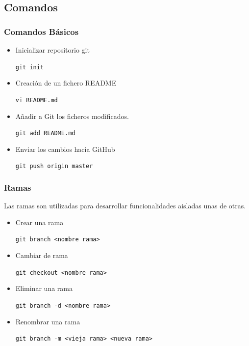 \documentclass{beamer}
\begin{document}
\subsection{Comandos}
	\begin{frame}
		\frametitle{Comandos Básicos}
		\begin{itemize}
			\item Inicializar repositorio git
			\begin{center}
				 {\tt \scriptsize git init}\\
			\end{center}
			\item Creación de un fichero README 
			\begin{center}
				 {\tt \scriptsize vi README.md}\\
			\end{center}
			\item Añadir a Git los ficheros modificados.
			\begin{center}
				 {\tt \scriptsize git add README.md}\\	 
			\end{center}
			\item Enviar los cambios hacia GitHub
			\begin{center}
				 {\tt \scriptsize git push origin master}\\	 
			\end{center}
		\end{itemize}
	\end{frame}
	\begin{frame}
		\frametitle{Ramas}
		Las ramas son utilizadas para desarrollar funcionalidades aisladas unas de otras.
		\begin{itemize}
			\item Crear una rama
			\begin{center}
				 {\tt \scriptsize git branch <nombre rama>}\\
			\end{center}
			\item Cambiar de rama
			\begin{center}
				 {\tt \scriptsize git checkout <nombre rama>}\\
			\end{center}
			\item Eliminar una rama
			\begin{center}
				 {\tt \scriptsize git branch -d <nombre rama>}\\	 
			\end{center}
			\item Renombrar una rama
			\begin{center}
				 {\tt \scriptsize git branch -m <vieja rama> <nueva rama>}\\	 
			\end{center}
		\end{itemize}
	\end{frame}
\end{document}
